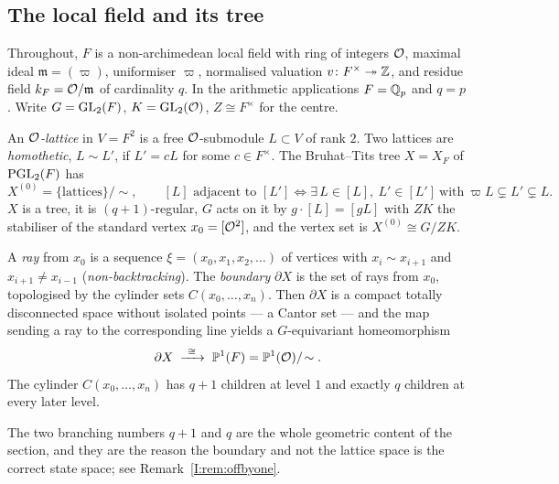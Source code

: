 \subsection{The local field and its tree}

Throughout, $F$ is a non-archimedean local field with ring of integers $\mathcal{O}$, maximal
ideal $\mathfrak{m}=(\varpi)$, uniformiser $\varpi$, normalised valuation
$v\colon F^\times\twoheadrightarrow\mathbb{Z}$, and residue field $k_F=\mathcal{O}/\mathfrak{m}$ of
cardinality $q$. In the arithmetic applications $F=\mathbb{Q}_p$ and $q=p$. Write
$G=\mathrm{GL}_2(F)$, $K=\mathrm{GL}_2(\mathcal{O})$, $Z\cong F^\times$ for the centre.

\begin{definition}\label{I:def:tree}
An \emph{$\mathcal{O}$-lattice} in $V=F^2$ is a free $\mathcal{O}$-submodule $L\subset V$ of rank $2$.
Two lattices are \emph{homothetic}, $L\sim L'$, if $L'=cL$ for some $c\in F^\times$. The
Bruhat--Tits tree $X=X_F$ of $\mathrm{PGL}_2(F)$ has
\[
X^{(0)}=\{\text{lattices}\}/\!\sim,\qquad
[L]\text{ adjacent to }[L']\iff\exists\,L\in[L],\ L'\in[L']\ \text{with}\
\varpi L\subsetneq L'\subsetneq L .
\]
$X$ is a tree, it is $(q+1)$-regular, $G$ acts on it by $g\cdot[L]=[gL]$ with $Z K$ the
stabiliser of the standard vertex $x_0=[\mathcal{O}^2]$, and the vertex set is
$X^{(0)}\cong G/ZK$.
\end{definition}

\begin{definition}[Boundary]\label{I:def:boundary}
A \emph{ray} from $x_0$ is a sequence $\xi=(x_0,x_1,x_2,\dots)$ of vertices with
$x_i\sim x_{i+1}$ and $x_{i+1}\neq x_{i-1}$ (\emph{non-backtracking}). The
\emph{boundary} $\partial X$ is the set of rays from $x_0$, topologised by the cylinder
sets $C(x_0,\dots,x_n)$. Then $\partial X$ is a compact totally disconnected space
without isolated points --- a Cantor set --- and the map sending a ray to the
corresponding line yields a $G$-equivariant homeomorphism
\[
\partial X\;\xrightarrow{\ \cong\ }\;\PPone(F)=\PPone(\cO)/\!\sim .
\]
The cylinder $C(x_0,\dots,x_n)$ has $q+1$ children at level $1$ and exactly $q$ children
at every later level.
\end{definition}

The two branching numbers $q+1$ and $q$ are the whole geometric content of the section,
and they are the reason the boundary and not the lattice space is the correct state
space; see Remark~\ref{I:rem:offbyone}.

